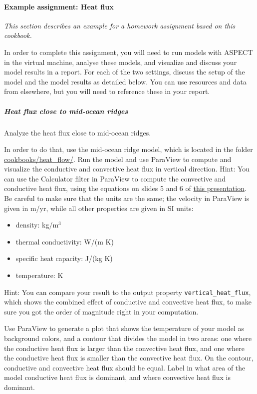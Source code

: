 \paragraph{Example assignment: Heat flux}
\textit{This section describes an example for a homework assignment based on this cookbook.}

In order to complete this assignment, you will need to run models with ASPECT in the virtual machine, analyse these models, and visualize and discuss your model results in a report. For each of the two settings, discuss the setup of the model and the model results as detailed below. You can use resources and data from elsewhere, but you will need to reference these in your report.

\subparagraph{Heat flux close to mid-ocean ridges}
Analyze the heat flux close to mid-ocean ridges. 

In order to do that, use the mid-ocean ridge model, which is located in the folder \url{cookbooks/heat_flow/}. Run the model and use ParaView to compute and visualize the conductive and convective heat flux in vertical direction. 
Hint: You can use the Calculator filter in ParaView to compute the convective and conductive heat flux, using the equations on slides 5 and 6 of \href{https://www.dropbox.com/s/tdfj9pi2mdq0fhe/04_geophysics_lecture_01_13.pdf?dl=0}{this presentation}. Be careful to make sure that the units are the same; the velocity in ParaView is given in m/yr, while all other properties are given in SI units:

\begin{itemize}
\item density: kg/m$^3$
\item thermal conductivity: W/(m K) 
\item specific heat capacity: J/(kg K) 
\item temperature: K 
\end{itemize}

Hint: You can compare your result to the output property \texttt{vertical\_heat\_flux}, which shows the combined effect of conductive and convective heat flux, to make sure you got the order of magnitude right in your computation. 

Use ParaView to generate a plot that shows the temperature of your model as background colors, 
and a contour that divides the model in two areas: one where the conductive heat flux is larger than the convective heat flux, and one where the conductive heat flux is smaller than the convective heat flux. On the contour, conductive and convective heat flux should be equal. 
Label in what area of the model conductive heat flux is dominant, and where convective heat flux is dominant. 


